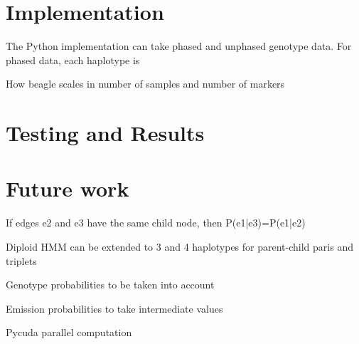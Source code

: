 \documentclass[a4paper,11pt,twoside,abstraction,titlepage]{article}
\begin{document}
\newpage
\section{Implementation}
The Python implementation can take phased and unphased genotype data.  For phased data, each haplotype is 

How beagle scales in number of samples and number of markers

\newpage
\section{Testing and Results}


\newpage
\section{Future work}
If edges e2 and e3 have the same child node, then P(e1|e3)=P(e1|e2)

Diploid HMM can be extended to 3 and 4 haplotypes for parent-child paris and triplets

Genotype probabilities to be taken into account

Emission probabilities to take intermediate values

Pycuda parallel computation

\newpage
\end{document}
